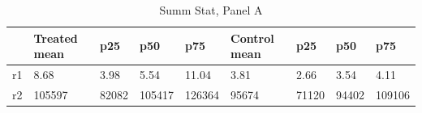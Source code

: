 \begin{table}[htbp]
\caption{\label{clabel} Summ Stat, Panel A}\centering\medskip
\begin{tabular}{|l|l|l|l|l|l|l|l|l|}\hline  
 & Treated mean  & p25  & p50  & p75  & Control mean  & p25  & p50  & p75  \\ \hline  
r1 & 8.68 & 3.98 & 5.54 & 11.04 & 3.81 & 2.66 & 3.54 & 4.11 \\ \hline 
r2 & 105597 & 82082 & 105417 & 126364 & 95674 & 71120 & 94402 & 109106 \\ \hline 
  \end{tabular}
\end{table}
